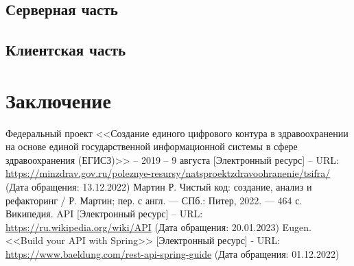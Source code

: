 \documentclass[a4paper,article]{article}
\begin{document}
    \subsection{Серверная часть}\label{Реализация. Серверная часть}

    \subsection{Клиентская часть}\label{Реализация. Клиентская часть}

    \newpage

    \section*{Заключение}

    \newpage


    \begin{thebibliography}{}
         Федеральный проект <<Создание единого цифрового контура в здравоохранении на основе единой государственной информационной системы в сфере здравоохранения (ЕГИСЗ)>> -- 2019 -- 9 августа [Электронный ресурс] -- URL: \url{https://minzdrav.gov.ru/poleznye-resursy/natsproektzdravoohranenie/tsifra/} (Дата обращения: 13.12.2022)
         Мартин Р. Чистый код: создание, анализ и рефакторинг / Р. Мартин; пер. с англ. — СПб.: Питер, 2022. — 464 с.
         Википедия. API [Электронный ресурс] -- URL: \url{https://ru.wikipedia.org/wiki/API} (Дата обращения: 20.01.2023)
         Eugen. <<Build your API with Spring>> [Электронный ресурс] - URL: \url{https://www.baeldung.com/rest-api-spring-guide} (Дата обращения: 01.12.2022)
    \end{thebibliography}
\end{document}

